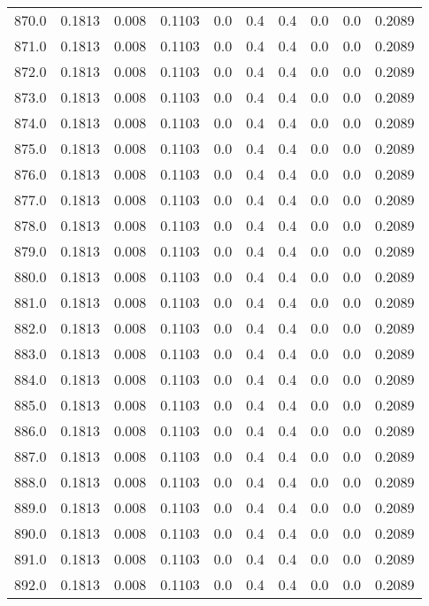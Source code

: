 \begin{longtable}{lrrrrrrrrr}
870.0 & 0.1813 & 0.008 & 0.1103 & 0.0 & 0.4 & 0.4 & 0.0 & 0.0 & 0.2089 \\
871.0 & 0.1813 & 0.008 & 0.1103 & 0.0 & 0.4 & 0.4 & 0.0 & 0.0 & 0.2089 \\
872.0 & 0.1813 & 0.008 & 0.1103 & 0.0 & 0.4 & 0.4 & 0.0 & 0.0 & 0.2089 \\
873.0 & 0.1813 & 0.008 & 0.1103 & 0.0 & 0.4 & 0.4 & 0.0 & 0.0 & 0.2089 \\
874.0 & 0.1813 & 0.008 & 0.1103 & 0.0 & 0.4 & 0.4 & 0.0 & 0.0 & 0.2089 \\
875.0 & 0.1813 & 0.008 & 0.1103 & 0.0 & 0.4 & 0.4 & 0.0 & 0.0 & 0.2089 \\
876.0 & 0.1813 & 0.008 & 0.1103 & 0.0 & 0.4 & 0.4 & 0.0 & 0.0 & 0.2089 \\
877.0 & 0.1813 & 0.008 & 0.1103 & 0.0 & 0.4 & 0.4 & 0.0 & 0.0 & 0.2089 \\
878.0 & 0.1813 & 0.008 & 0.1103 & 0.0 & 0.4 & 0.4 & 0.0 & 0.0 & 0.2089 \\
879.0 & 0.1813 & 0.008 & 0.1103 & 0.0 & 0.4 & 0.4 & 0.0 & 0.0 & 0.2089 \\
880.0 & 0.1813 & 0.008 & 0.1103 & 0.0 & 0.4 & 0.4 & 0.0 & 0.0 & 0.2089 \\
881.0 & 0.1813 & 0.008 & 0.1103 & 0.0 & 0.4 & 0.4 & 0.0 & 0.0 & 0.2089 \\
882.0 & 0.1813 & 0.008 & 0.1103 & 0.0 & 0.4 & 0.4 & 0.0 & 0.0 & 0.2089 \\
883.0 & 0.1813 & 0.008 & 0.1103 & 0.0 & 0.4 & 0.4 & 0.0 & 0.0 & 0.2089 \\
884.0 & 0.1813 & 0.008 & 0.1103 & 0.0 & 0.4 & 0.4 & 0.0 & 0.0 & 0.2089 \\
885.0 & 0.1813 & 0.008 & 0.1103 & 0.0 & 0.4 & 0.4 & 0.0 & 0.0 & 0.2089 \\
886.0 & 0.1813 & 0.008 & 0.1103 & 0.0 & 0.4 & 0.4 & 0.0 & 0.0 & 0.2089 \\
887.0 & 0.1813 & 0.008 & 0.1103 & 0.0 & 0.4 & 0.4 & 0.0 & 0.0 & 0.2089 \\
888.0 & 0.1813 & 0.008 & 0.1103 & 0.0 & 0.4 & 0.4 & 0.0 & 0.0 & 0.2089 \\
889.0 & 0.1813 & 0.008 & 0.1103 & 0.0 & 0.4 & 0.4 & 0.0 & 0.0 & 0.2089 \\
890.0 & 0.1813 & 0.008 & 0.1103 & 0.0 & 0.4 & 0.4 & 0.0 & 0.0 & 0.2089 \\
891.0 & 0.1813 & 0.008 & 0.1103 & 0.0 & 0.4 & 0.4 & 0.0 & 0.0 & 0.2089 \\
892.0 & 0.1813 & 0.008 & 0.1103 & 0.0 & 0.4 & 0.4 & 0.0 & 0.0 & 0.2089 \\

\end{longtable}
